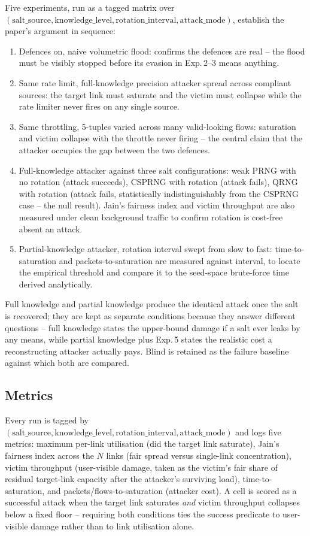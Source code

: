 \documentclass[conference]{IEEEtran}
\begin{document}
Five experiments, run as a tagged matrix over $(\mathrm{salt\_source}, \mathrm{knowledge\_level},
\mathrm{rotation\_interval}, \mathrm{attack\_mode})$, establish the paper's argument in sequence:
\begin{enumerate}
\item[\textbf{Exp.\,1}] Defences on, naive volumetric flood: confirms the defences are real -- the flood must be
visibly stopped before its evasion in Exp.\,2--3 means anything.
\item[\textbf{Exp.\,2}] Same rate limit, full-knowledge precision attacker spread across compliant sources: the
target link must saturate and the victim must collapse while the rate limiter never fires on any single source.
\item[\textbf{Exp.\,3}] Same throttling, 5-tuples varied across many valid-looking flows: saturation and victim
collapse with the throttle never firing -- the central claim that the attacker occupies the gap between the two
defences.
\item[\textbf{Exp.\,4}] Full-knowledge attacker against three salt configurations: weak PRNG with no rotation
(attack succeeds), CSPRNG with rotation (attack fails), QRNG with rotation (attack fails, statistically
indistinguishably from the CSPRNG case -- the null result). Jain's fairness index and victim throughput are also
measured under clean background traffic to confirm rotation is cost-free absent an attack.
\item[\textbf{Exp.\,5}] Partial-knowledge attacker, rotation interval swept from slow to fast: time-to-saturation
and packets-to-saturation are measured against interval, to locate the empirical threshold and compare it to the
seed-space brute-force time derived analytically.
\end{enumerate}
Full knowledge and partial knowledge produce the identical attack once the salt is recovered; they are kept as
separate conditions because they answer different questions -- full knowledge states the upper-bound damage if a
salt ever leaks by any means, while partial knowledge plus Exp.\,5 states the realistic cost a reconstructing
attacker actually pays. Blind is retained as the failure baseline against which both are compared.

\subsection{Metrics}

Every run is tagged by $(\mathrm{salt\_source}, \mathrm{knowledge\_level}, \mathrm{rotation\_interval},
\mathrm{attack\_mode})$ and logs five metrics: maximum per-link utilisation (did the target link saturate),
Jain's fairness index across the $N$ links (fair spread versus single-link concentration), victim throughput
(user-visible damage, taken as the victim's fair share of residual target-link capacity after the attacker's
surviving load), time-to-saturation, and packets/flows-to-saturation (attacker cost).
A cell is scored as a successful attack when the target link saturates \emph{and} victim throughput collapses
below a fixed floor -- requiring both conditions ties the success predicate to user-visible damage rather than
to link utilisation alone.
\end{document}
